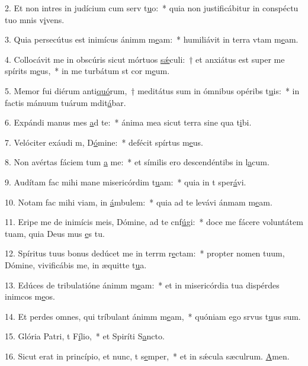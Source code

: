 2. Et non intres in judícium cum serv t\uline{u}o:~* quia non justificábitur in conspéctu tuo mnis v\uline{i}vens.\par 
3. Quia persecútus est inimícus ánimm m\uline{e}am:~* humiliávit in terra vtam m\uline{e}am.\par 
4. Collocávit me in obscúris sicut mórtuos \uline{sǽ}culi:~† et anxiátus est super me spírits m\uline{e}us,~* in me turbátum st cor m\uline{e}um.\par 
5. Memor fui diérum anti\uline{quó}rum,~† meditátus sum in ómnibus opéribs t\uline{u}is:~* in factis mánuum tuárum mdit\uline{á}bar.\par 
6. Expándi manus mes \uline{a}d te:~* ánima mea sicut terra sine qua t\uline{i}bi.\par 
7. Velóciter exáudi m, D\uline{ó}mine:~* defécit spírtus m\uline{e}us.\par 
8. Non avértas fáciem tum \uline{a} me:~* et símilis ero descendéntibs in l\uline{a}cum.\par 
9. Audítam fac mihi mane misericórdim t\uline{u}am:~* quia in t sper\uline{á}vi.\par 
10. Notam fac mihi viam, in  \uline{á}mbulem:~* quia ad te levávi ánmam m\uline{e}am.\par 
11. Eripe me de inimícis meis, Dómine, ad te cnf\uline{ú}gi:~* doce me fácere voluntátem tuam, quia Deus mus \uline{e}s tu.\par 
12. Spíritus tuus bonus dedúcet me in terrm r\uline{e}ctam:~* propter nomen tuum, Dómine, vivificábis me, in æquitte t\uline{u}a.\par 
13. Edúces de tribulatióne ánimm m\uline{e}am:~* et in misericórdia tua dispérdes inimcos m\uline{e}os.\par 
14. Et perdes omnes, qui tríbulant ánimm m\uline{e}am,~* quóniam ego srvus t\uline{u}us sum.\par 
15. Glória Patri, t F\uline{í}lio,~* et Spiríti S\uline{a}ncto.\par 
16. Sicut erat in princípio, et nunc, t s\uline{e}mper,~* et in sǽcula sæculrum. \uline{A}men.\par 
